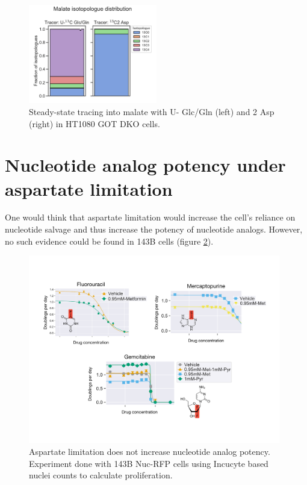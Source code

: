 \begin{figure}[ht]
    \centering
    \includegraphics[width=0.5\textwidth]{figures/sapp/DKO_char/HT1080_Mal_iso_dist.pdf}
    \caption[\hCi{} Gln/Glc, Asp tracing in HT1080 GOT DKO, Malate]{
    Steady-state tracing into malate with U-\hCi{} Glc/Gln (left) and \hCi{}2 Asp (right) in HT1080 GOT DKO cells.
    }
    \label{fig:sapp:DKO_char:HT1080_Mal_iso_dist}
\end{figure}




\FloatBarrier
\section{Nucleotide analog potency under aspartate limitation}
One would think that aspartate limitation would increase the cell's reliance on nucleotide salvage and thus increase the potency of nucleotide analogs.
However, no such evidence could be found in 143B cells (figure \ref{fig:sapp:random:nucleotide_analogs}).

\begin{figure}[ht]
    \centering
    \includegraphics[width=0.98\textwidth]{figures/sapp/random/nucleotide_analogs.pdf}
    \caption[Asp limitation does not increase nucleotide analog potency.]{
    Aspartate limitation does not increase nucleotide analog potency.
    Experiment done with 143B Nuc-RFP cells using Incucyte based nuclei counts to calculate proliferation.
    }
    \label{fig:sapp:random:nucleotide_analogs}
\end{figure}




